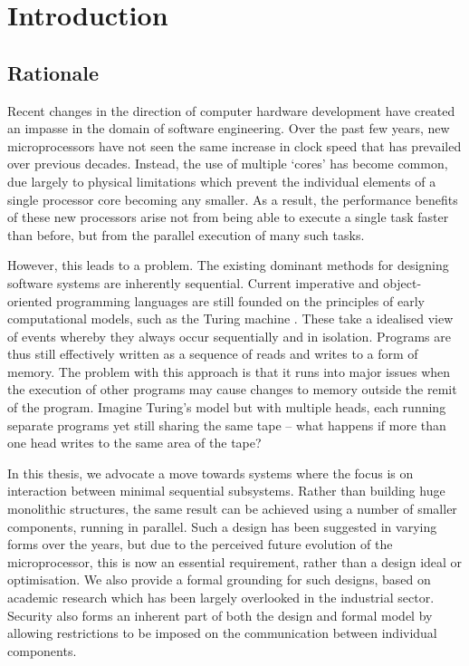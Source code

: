 \chapter{Introduction}
\label{introduction}

\section{Rationale}

Recent changes in the direction of computer hardware development have
created an impasse in the domain of software engineering.  Over the
past few years, new microprocessors have not seen the same increase in
clock speed that has prevailed over previous decades.  Instead, the
use of multiple `cores' has become common, due largely to physical
limitations which prevent the individual elements of a single
processor core becoming any smaller.  As a result, the performance
benefits of these new processors arise not from being able to execute
a single task faster than before, but from the parallel execution of
many such tasks.

However, this leads to a problem.  The existing dominant methods for
designing software systems are inherently sequential.  Current
imperative and object-oriented programming languages are still founded
on the principles of early computational models, such as the Turing
machine \cite{turing:36}.  These take a idealised view of events
whereby they always occur sequentially and in isolation.  Programs are
thus still effectively written as a sequence of reads and writes to a
form of memory.  The problem with this approach is that it runs into
major issues when the execution of other programs may cause changes to
memory outside the remit of the program.  Imagine Turing's model but
with multiple heads, each running separate programs yet still sharing
the same tape -- what happens if more than one head writes to the same
area of the tape?

In this thesis, we advocate a move towards systems where the focus is
on interaction between minimal sequential subsystems.  Rather than
building huge monolithic structures, the same result can be achieved
using a number of smaller components, running in parallel.  Such a
design has been suggested in varying forms over the years, but due to
the perceived future evolution of the microprocessor, this is now an
essential requirement, rather than a design ideal or optimisation.  We
also provide a formal grounding for such designs, based on academic
research which has been largely overlooked in the industrial sector.
Security also forms an inherent part of both the design and formal
model by allowing restrictions to be imposed on the communication
between individual components.

